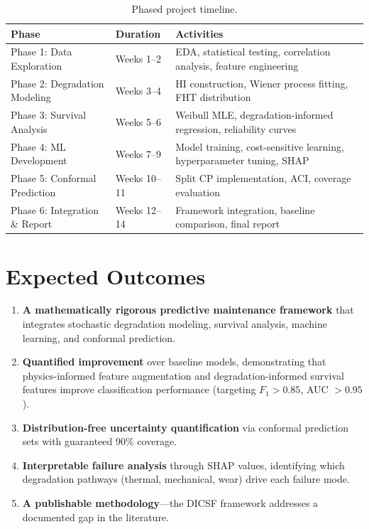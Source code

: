 \documentclass[12pt, a4paper]{article}
\begin{document}
\begin{table}[H]
    \centering
    \caption{Phased project timeline.}
    \label{tab:timeline}
    \begin{tabularx}{\textwidth}{l l X}
        \toprule
        \textbf{Phase} & \textbf{Duration} & \textbf{Activities} \\
        \midrule
        Phase 1: Data Exploration & Weeks 1--2 & EDA, statistical testing, correlation analysis, feature engineering \\
        Phase 2: Degradation Modeling & Weeks 3--4 & HI construction, Wiener process fitting, FHT distribution \\
        Phase 3: Survival Analysis & Weeks 5--6 & Weibull MLE, degradation-informed regression, reliability curves \\
        Phase 4: ML Development & Weeks 7--9 & Model training, cost-sensitive learning, hyperparameter tuning, SHAP \\
        Phase 5: Conformal Prediction & Weeks 10--11 & Split CP implementation, ACI, coverage evaluation \\
        Phase 6: Integration \& Report & Weeks 12--14 & Framework integration, baseline comparison, final report \\
        \bottomrule
    \end{tabularx}
\end{table}


\section{Expected Outcomes}

\begin{enumerate}
    \item \textbf{A mathematically rigorous predictive maintenance framework} that integrates stochastic degradation modeling, survival analysis, machine learning, and conformal prediction.
    \item \textbf{Quantified improvement} over baseline models, demonstrating that physics-informed feature augmentation and degradation-informed survival features improve classification performance (targeting $F_1 > 0.85$, AUC $> 0.95$).
    \item \textbf{Distribution-free uncertainty quantification} via conformal prediction sets with guaranteed 90\% coverage.
    \item \textbf{Interpretable failure analysis} through SHAP values, identifying which degradation pathways (thermal, mechanical, wear) drive each failure mode.
    \item \textbf{A publishable methodology}---the DICSF framework addresses a documented gap in the literature.
\end{enumerate}
\end{document}
